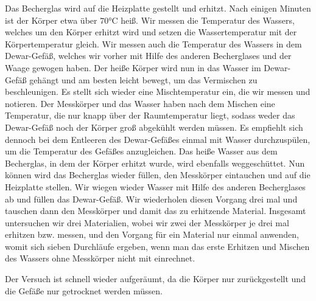 Das Becherglas wird auf die Heizplatte gestellt und erhitzt. Nach einigen Minuten ist der Körper etwa über $70\si{\celsius}$ heiß.
Wir messen die Temperatur des Wassers, welches um den Körper erhitzt wird und setzen die Wassertemperatur mit der Körpertemperatur gleich.
Wir messen auch die Temperatur des Wassers in dem Dewar-Gefäß, welches wir vorher mit Hilfe des anderen Becherglases und der Waage gewogen haben.
Der heiße Körper wird nun in das Wasser im Dewar-Gefäß gehängt und am besten leicht bewegt, um das Vermischen zu beschleunigen.
Es stellt sich wieder eine Mischtemperatur ein, die wir messen und notieren. Der Messkörper und das Wasser haben nach dem Mischen eine Temperatur,
die nur knapp über der Raumtemperatur liegt, sodass weder das Dewar-Gefäß noch der Körper groß abgekühlt werden müssen.
Es empfiehlt sich dennoch bei dem Entleeren des Dewar-Gefäßes einmal mit Wasser durchzuspülen, um die Temperatur des Gefäßes anzugleichen.
Das heiße Wasser aus dem Becherglas, in dem der Körper erhitzt wurde, wird ebenfalls weggeschüttet.
Nun können wird das Becherglas wieder füllen, den Messkörper eintauchen und auf die Heizplatte stellen.
Wir wiegen wieder Wasser mit Hilfe des anderen Becherglases ab und füllen das Dewar-Gefäß.
Wir wiederholen diesen Vorgang drei mal und tauschen dann den Messkörper und damit das zu erhitzende Material.
Insgesamt untersuchen wir drei Materialien, wobei wir zwei der Messkörper je drei mal erhitzen bzw. messen, und den Vorgang für ein Material nur 
einmal anwenden, womit sich sieben Durchläufe ergeben, wenn man das erste Erhitzen und Mischen des Wassers ohne Messkörper nicht mit einrechnet.

Der Versuch ist schnell wieder aufgeräumt, da die Körper nur zurückgestellt und die Gefäße nur getrocknet werden müssen.